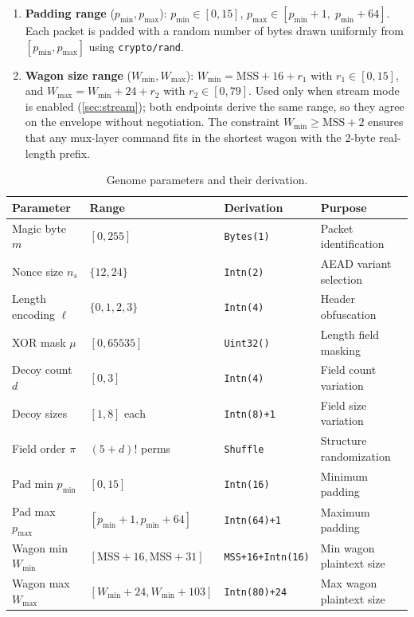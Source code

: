 \documentclass[11pt,a4paper]{article}
\begin{document}
\begin{enumerate}
  \item \textbf{Padding range} ($p_{\min}, p_{\max}$): $p_{\min} \in [0, 15]$, $p_{\max} \in [p_{\min}+1,\; p_{\min}+64]$. Each packet is padded with a random number of bytes drawn uniformly from $[p_{\min}, p_{\max}]$ using \texttt{crypto/rand}.

  \item \textbf{Wagon size range} ($W_{\min}, W_{\max}$): $W_{\min} = \text{MSS} + 16 + r_1$ with $r_1 \in [0, 15]$, and $W_{\max} = W_{\min} + 24 + r_2$ with $r_2 \in [0, 79]$. Used only when stream mode is enabled (\cref{sec:stream}); both endpoints derive the same range, so they agree on the envelope without negotiation. The constraint $W_{\min} \geq \text{MSS} + 2$ ensures that any mux-layer command fits in the shortest wagon with the 2-byte real-length prefix.
\end{enumerate}

\begin{table}[htbp]
\centering
\caption{Genome parameters and their derivation.}
\label{tab:genome}
\begin{tabular}{@{}llll@{}}
\toprule
\textbf{Parameter} & \textbf{Range} & \textbf{Derivation} & \textbf{Purpose} \\
\midrule
Magic byte $m$ & $[0, 255]$ & \texttt{Bytes(1)} & Packet identification \\
Nonce size $n_s$ & $\{12, 24\}$ & \texttt{Intn(2)} & AEAD variant selection \\
Length encoding $\ell$ & $\{0,1,2,3\}$ & \texttt{Intn(4)} & Header obfuscation \\
XOR mask $\mu$ & $[0, 65535]$ & \texttt{Uint32()} & Length field masking \\
Decoy count $d$ & $[0, 3]$ & \texttt{Intn(4)} & Field count variation \\
Decoy sizes & $[1, 8]$ each & \texttt{Intn(8)+1} & Field size variation \\
Field order $\pi$ & $(5+d)!$ perms & \texttt{Shuffle} & Structure randomization \\
Pad min $p_{\min}$ & $[0, 15]$ & \texttt{Intn(16)} & Minimum padding \\
Pad max $p_{\max}$ & $[p_{\min}+1, p_{\min}+64]$ & \texttt{Intn(64)+1} & Maximum padding \\
Wagon min $W_{\min}$ & $[\text{MSS}{+}16, \text{MSS}{+}31]$ & \texttt{MSS+16+Intn(16)} & Min wagon plaintext size \\
Wagon max $W_{\max}$ & $[W_{\min}{+}24, W_{\min}{+}103]$ & \texttt{Intn(80)+24} & Max wagon plaintext size \\
\bottomrule
\end{tabular}
\end{table}
\end{document}
